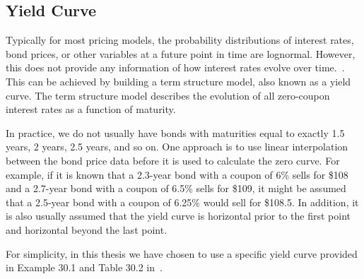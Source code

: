 \subsection{Yield Curve}
Typically for most pricing models, the probability distributions of interest rates, bond prices, or other variables at a future point in time are lognormal. However, this does not provide any information of how interest rates evolve over time.~\cite[pg. 682]{ofod}. This can be achieved by building a term structure model, also known as a yield curve. The term structure model describes the evolution of all zero-coupon interest rates as a function of maturity.~\cite[pg.83]{ofod}

In practice, we do not usually have bonds with maturities equal to exactly 1.5 years, 2 years, 2.5 years, and so on. One approach is to use linear interpolation between the bond price data before it is used to calculate the zero curve. For example, if it is known that a 2.3-year bond with a coupon of 6\% sells for \$108 and a 2.7-year bond with a coupon of 6.5\% sells for \$109, it might be assumed that a 2.5-year bond with a coupon of 6.25\% would sell for \$108.5. In addition, it is also usually assumed that the yield curve is horizontal prior to the first point and horizontal beyond the last point.~\cite[pg.83]{ofod}

For simplicity, in this thesis we have chosen to use a specific yield curve provided in Example 30.1 and Table 30.2 in~\cite[pg.706]{ofod}.




